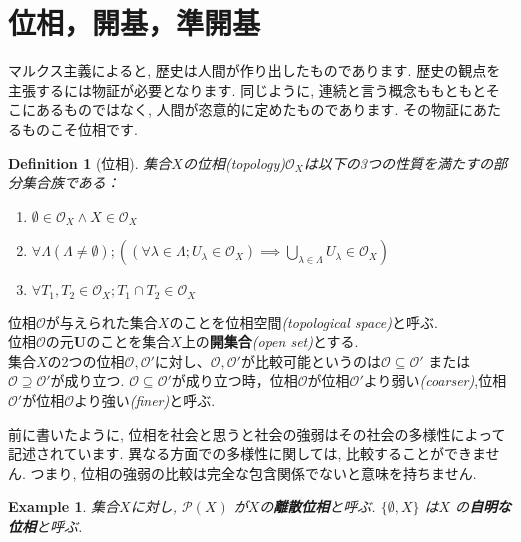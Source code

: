 \documentclass[lualatex]{ltjsbook}
\newtheorem{definition}[theorem]{Definition}
\theoremstyle{remark}
\theoremstyle{plain}
\newtheorem{example}[theorem]{Example}
\begin{document}
\section{位相，開基，準開基}

マルクス主義によると, 歴史は人間が作り出したものであります. 歴史の観点を主張するには物証が必要となります.
同じように, 連続と言う概念ももともとそこにあるものではなく, 人間が恣意的に定めたものであります. その物証にあたるものこそ位相です. 


\begin{definition}[位相]
	集合$X$の位相\textit{(topology)}$\mathcal{O}_X$は以下の3つの性質を満たすの部分集合族である：

	\begin{enumerate}
		\item $\emptyset \in \mathcal{O}_X \land X \in \mathcal{O}_X$
		\item $\forall \Lambda\left( \Lambda \neq \emptyset \right) ;\left( \left( \forall \lambda \in \Lambda; U_{\lambda} \in \mathcal{O}_X \right) \implies \bigcup_{\lambda \in \Lambda} U_{\lambda} \in \mathcal{O}_X \right) $ 
		\item $\forall T_1, T_2 \in \mathcal{O}_X; T_1\cap T_2 \in \mathcal{O}_X$
	\end{enumerate}

\end{definition}


位相$\mathcal{O}$が与えられた集合$X$のことを位相空間\textit{(topological space)}と呼ぶ.\\
位相$\mathcal{O}$の元$\mathbf{U}$のことを集合$X$上の\textbf{開集合}\textit{(open set)}とする.\\
集合$X$の2つの位相$\mathcal{O},\mathcal{O}'$に対し、$\mathcal{O},\mathcal{O}'$が比較可能というのは$\mathcal{O} \subseteq \mathcal{O}' $ または$ \mathcal{O} \supseteq \mathcal{O}'$が成り立つ.
$\mathcal{O} \subseteq \mathcal{O}'$が成り立つ時，位相$\mathcal{O}$が位相$\mathcal{O}'$より弱い\textit{(coarser)},位相$\mathcal{O}'$が位相$\mathcal{O}$より強い\textit{(finer)}と呼ぶ.

前に書いたように, 位相を社会と思うと社会の強弱はその社会の多様性によって記述されています. 異なる方面での多様性に関しては, 比較することができません. つまり, 位相の強弱の比較は完全な包含関係でないと意味を持ちません.

\begin{example}
	集合$X$に対し, $\mathcal{P}\left( X \right) $ が$X$の\textbf{離散位相}と呼ぶ. $\{\emptyset , X\} $ は$X$ の\textbf{自明な位相}と呼ぶ.
\end{example}
\end{document}
